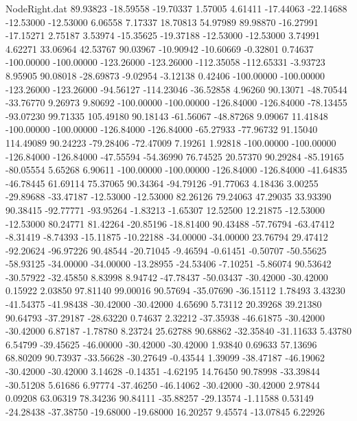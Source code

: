 \begin{filecontents}{NodeRight.dat}
  89.93823  -18.59558  -19.70337     1.57005    4.61411  -17.44063  -22.14688  -12.53000  -12.53000    6.06558    7.17337   18.70813   54.97989
  89.98870  -16.27991  -17.15271     2.75187    3.53974  -15.35625  -19.37188  -12.53000  -12.53000    3.74991    4.62271   33.06964   42.53767
  90.03967  -10.90942  -10.60669    -0.32801    0.74637 -100.00000 -100.00000 -123.26000 -123.26000 -112.35058 -112.65331   -3.93723    8.95905
  90.08018  -28.69873   -9.02954    -3.12138    0.42406 -100.00000 -100.00000 -123.26000 -123.26000  -94.56127 -114.23046  -36.52858    4.96260
  90.13071  -48.70544  -33.76770     9.26973    9.80692 -100.00000 -100.00000 -126.84000 -126.84000  -78.13455  -93.07230   99.71335  105.49180
  90.18143  -61.56067  -48.87268     9.09067   11.41848 -100.00000 -100.00000 -126.84000 -126.84000  -65.27933  -77.96732   91.15040  114.49089
  90.24223  -79.28406  -72.47009     7.19261    1.92818 -100.00000 -100.00000 -126.84000 -126.84000  -47.55594  -54.36990   76.74525   20.57370
  90.29284  -85.19165  -80.05554     5.65268    6.90611 -100.00000 -100.00000 -126.84000 -126.84000  -41.64835  -46.78445   61.69114   75.37065
  90.34364  -94.79126  -91.77063     4.18436    3.00255  -29.89688  -33.47187  -12.53000  -12.53000   82.26126   79.24063   47.29035   33.93390
  90.38415  -92.77771  -93.95264    -1.83213   -1.65307   12.52500   12.21875  -12.53000  -12.53000   80.24771   81.42264  -20.85196  -18.81400
  90.43488  -57.76794  -63.47412    -8.31419   -8.74393  -15.11875  -10.22188  -34.00000  -34.00000   23.76794   29.47412  -92.20624  -96.97226
  90.48544  -20.71045   -9.46594    -0.61451   -0.50707  -50.55625  -58.93125  -34.00000  -34.00000  -13.28955  -24.53406   -7.10251   -5.86074
  90.53642  -30.57922  -32.45850     8.83998    8.94742  -47.78437  -50.03437  -30.42000  -30.42000    0.15922    2.03850   97.81140   99.00016
  90.57694  -35.07690  -36.15112     1.78493    3.43230  -41.54375  -41.98438  -30.42000  -30.42000    4.65690    5.73112   20.39268   39.21380
  90.64793  -37.29187  -28.63220     0.74637    2.32212  -37.35938  -46.61875  -30.42000  -30.42000    6.87187   -1.78780    8.23724   25.62788
  90.68862  -32.35840  -31.11633     5.43780    6.54799  -39.45625  -46.00000  -30.42000  -30.42000    1.93840    0.69633   57.13696   68.80209
  90.73937  -33.56628  -30.27649    -0.43544    1.39099  -38.47187  -46.19062  -30.42000  -30.42000    3.14628   -0.14351   -4.62195   14.76450
  90.78998  -33.39844  -30.51208     5.61686    6.97774  -37.46250  -46.14062  -30.42000  -30.42000    2.97844    0.09208   63.06319   78.34236
  90.84111  -35.88257  -29.13574    -1.11588    0.53149  -24.28438  -37.38750  -19.68000  -19.68000   16.20257    9.45574  -13.07845    6.22926

\end{filecontents}
